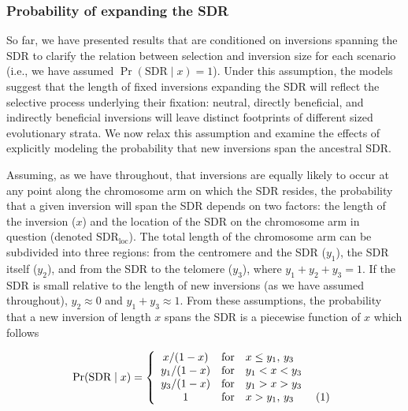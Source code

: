 \documentclass{article}
\newcommand\numberthis{\addtocounter{equation}{1}\tag{\theequation}}
\begin{document}



\subsubsection*{Probability of expanding the SDR}\label{sec:ProbExpSDR}

So far, we have presented results that are conditioned on inversions spanning the SDR to clarify the relation between selection and inversion size for each scenario (i.e., we have assumed $\Pr(\text{SDR} \mid x) = 1$). Under this assumption, the models suggest that the length of fixed inversions expanding the SDR will reflect the selective process underlying their fixation: neutral, directly beneficial, and indirectly beneficial inversions will leave distinct footprints of different sized evolutionary strata. We now relax this assumption and examine the effects of explicitly modeling the probability that new inversions span the ancestral SDR.

Assuming, as we have throughout, that inversions are equally likely to occur at any point along the chromosome arm on which the SDR resides, the probability that a given inversion will span the SDR depends on two factors: the length of the inversion ($x$) and the location of the SDR on the chromosome arm in question (denoted $\text{SDR}_{\text{loc}}$). The total length of the chromosome arm can be subdivided into three regions: from the centromere and the SDR ($y_1$), the SDR itself ($y_2$), and from the SDR to the telomere ($y_3$), where $y_1 + y_2 + y_3 = 1$. If the SDR is small relative to the length of new inversions (as we have assumed throughout), $y_2 \approx 0$ and $y_1 + y_3 \approx 1$. From these assumptions, the probability that a new inversion of length $x$ spans the SDR is a piecewise function of $x$ which follows

\begin{equation}\label{eq:PrSpanSDR}
	\Pr(\text{SDR} \mid x) = \left\{ 
		\begin{array}{ccl} 
			x  /(1 - x) & \mbox{for} & x \leq y_1,\,y_3 \\
			y_1/(1 - x) & \mbox{for} & y_1 < x < y_3 \\ 
			y_3/(1 - x) & \mbox{for} & y_1 > x > y_3 \\ 
			1 & \mbox{for} & x > y_1,\,y_3 \numberthis			
		\end{array}\right.
\end{equation}
\end{document}
